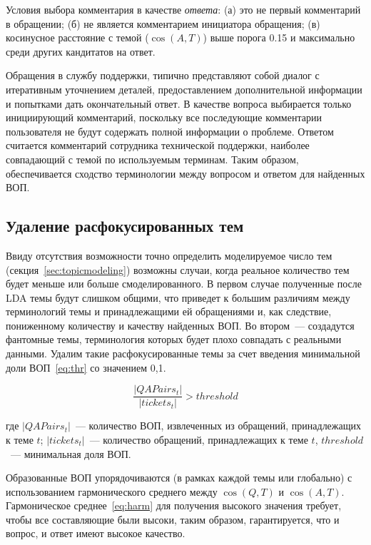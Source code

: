 Условия выбора комментария в качестве \textit{ответа}: (а) это не первый комментарий в обращении; (б) не является комментарием инициатора обращения; (в) косинусное расстояние с темой ($\cos(A,T)$) выше порога 0.15 и максимально среди других кандитатов на ответ.

Обращения в службу поддержки, типично представляют собой диалог с итеративным уточнением деталей, предоставлением дополнительной информации и попытками дать окончательный ответ. В качестве вопроса выбирается только инициирующий комментарий, поскольку все последующие комментарии пользователя не будут содержать полной информации о проблеме. Ответом считается комментарий сотрудника технической поддержки, наиболее совпадающий с темой по используемым терминам. Таким образом, обеспечивается сходство терминологии между вопросом и ответом для найденных ВОП.

\subsection{Удаление расфокусированных тем}
\label{subsec:deleteunfocusedtopics}

Ввиду отсутствия возможности точно определить моделируемое число тем (секция~\ref{sec:topicmodeling}) возможны случаи, когда реальное количество тем будет меньше или больше смоделированного. В первом случае полученные после LDA темы будут слишком общими, что приведет к большим различиям между терминологий темы и принадлежащими ей обращениями и, как следствие, пониженному количеству и качеству найденных ВОП. Во втором~--- создадутся фантомные темы, терминология которых будет плохо совпадать с реальными данными. Удалим такие расфокусированные темы за счет введения минимальной доли ВОП~\eqref{eq:thr} со значением 0,1.

\begin{equation}\label{eq:thr}
\frac{|QAPairs_t|}{|tickets_t|}>threshold
\end{equation}

где $|QAPairs_t|$~--- количество ВОП, извлеченных из обращений, принадлежащих к теме $t$; $|tickets_t|$~--- количество обращений, принадлежащих к теме $t$, $threshold$~--- минимальная доля ВОП.

Образованные ВОП упорядочиваются (в рамках каждой темы или глобально) с использованием гармонического среднего между $\cos(Q,T)$ и $\cos(A,T)$. Гармоническое среднее~\eqref{eq:harm} для получения высокого значения требует, чтобы все составляющие были высоки, таким образом, гарантируется, что и вопрос, и ответ имеют высокое качество.

